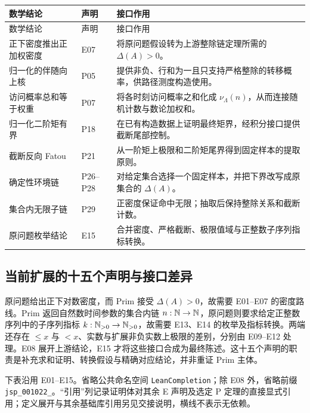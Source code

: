 {\small
\begin{longtable}{@{}p{.29\linewidth}p{.14\linewidth}p{.49\linewidth}@{}}
\toprule 数学结论 & 声明 & 接口作用\\\midrule
\endfirsthead
\toprule 数学结论 & 声明 & 接口作用\\\midrule
\endhead
正下密度推出正加权密度 & E07 & 将原问题假设转为上游整除链定理所需的 $\Delta(A)>0$。\\
归一化的伴随向上核 & P05 & 提供非负、行和为一且只支持严格整除的转移概率，供路径测度构造使用。\\
访问概率总和等于权重 & P07 & 将各时刻访问概率之和化成 $\nu_\Lambda(n)$，从而连接随机计数与数论加权和。\\
归一化二阶矩有界 & P18 & 在已有构造数据上证明最终矩界，经积分接口提供截断尾部控制。\\
截断反向 Fatou & P21 & 从一阶矩上极限和二阶矩尾界得到固定样本的提取原则。\\
确定性环境链 & P26--P28 & 对给定集合选择一个固定样本，并把下界改写成原集合的 $\Delta(A)$。\\
集合内无限子链 & P29 & 正密度保证命中无限；抽取后保持整除关系和截断计数。\\
原问题枚举结论 & E15 & 合并密度、严格截断、极限值域与正整数子序列指标转换。\\
\bottomrule
\end{longtable}}

\subsection{当前扩展的十五个声明与接口差异}
原问题给出正下对数密度，而 Prim 接受 $\Delta(A)>0$，故需要 E01--E07 的密度路线。Prim 返回自然数时间参数的集合内链 $n:\mathbb N\to\mathbb N$，原问题则要求给定正整数序列中的子序列指标 $k:\mathbb N_{>0}\to\mathbb N_{>0}$，故需要 E13、E14 的枚举及指标转换。两端还存在 $\le x$ 与 $<x$、实数与扩展非负实数上极限的差别，分别由 E09--E12 处理。E08 展开上游结论，E15 才将这些接口合成为最终陈述。这十五个声明的职责是补充求和证明、转换假设与精确对应结论，并非重证 Prim 主体。

下表沿用 E01--E15。省略公共命名空间 \nolinkurl{LeanCompletion}；除 E08 外，省略前缀 \nolinkurl{jsp_001022_}。“引用”列记录证明体对其余 E 声明及选定 P 定理的直接显式引用；定义展开与其余基础库引用另见交接说明，横线不表示无依赖。

